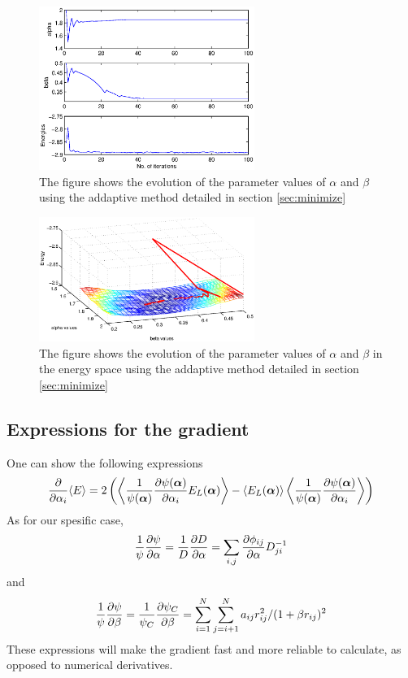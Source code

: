 \documentclass[aps,prc,twocolumn,floatfix]{revtex4}
\def\alphavec{\boldsymbol\alpha}
\begin{document}
  \begin{figure}
\centering
\includegraphics[width=7cm]{figures/addaptiveplot1.eps}
\caption{\label{fig:addap1} The figure shows the evolution of the parameter values of $\alpha$ and $\beta$ using the addaptive method detailed in section \ref{sec:minimize}}
\end{figure}

 \begin{figure}
\centering
\includegraphics[width=7cm]{figures/addaptiveplot2.eps}
\caption{\label{fig:addap2} The figure shows the evolution of the parameter values of $\alpha$ and $\beta$ in the energy space using the addaptive method detailed in section \ref{sec:minimize}}
\end{figure}
 
 \subsection{Expressions for the gradient}
 One can show the following expressions
 \begin{equation}
  {\partial  \over \partial \alpha_i}\langle E \rangle = 2\left(  \left\langle {1 \over \psi(\alphavec)} {\partial \psi(\alphavec) \over \partial \alpha_i}  E_L(\alphavec) \right\rangle - \left\langle E_L(\alphavec) \right\rangle \left\langle {1 \over \psi(\alphavec)} {\partial \psi(\alphavec) \over \partial \alpha_i} \right\rangle \right)
 \end{equation}
As for our spesific case, 
\begin{equation}
 {1\over \psi}{\partial \psi \over \partial \alpha} = {1\over D}{\partial D \over \partial \alpha} = \sum_{i,j} {\partial \phi_{ij} \over \partial \alpha} D_{ji}^{-1}
\end{equation}
and 
\begin{equation}
 {1 \over \psi} {\partial \psi \over \partial \beta} = {1 \over \psi_C} {\partial \psi_C \over \partial \beta} = \sum_{i=1}^N \sum_{j=i+1}^N a_{ij}r_{ij}^2/(1+\beta r_{ij})^2
 \end{equation}
These expressions will make the gradient fast and more reliable to calculate, as opposed to numerical derivatives. 
\end{document}
